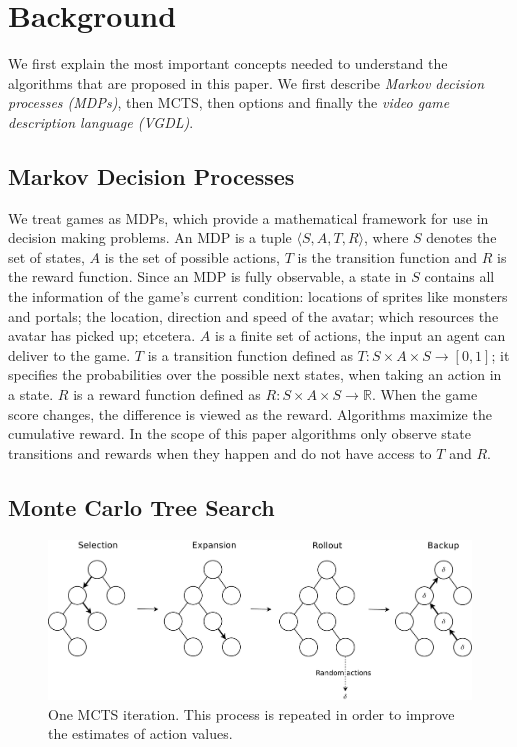 \section{Background}
\label{sec:background}

We first explain the most important concepts needed to understand the
algorithms that are proposed in this paper. We first describe \emph{Markov
decision processes (MDPs)}, then  MCTS, then options and finally the \emph{video
game description language (VGDL)}.

\subsection{Markov Decision Processes}
\label{subsec:mdps}
We treat games as MDPs, which provide a mathematical framework for use in
decision making problems. An MDP is a tuple $\langle S, A, T, R \rangle$, where
$S$ denotes the set of states, $A$ is the set of possible actions, $T$ is the
transition function and $R$ is the reward function. Since an MDP is fully
observable, a state in $S$ contains all the information of the game's current
condition: locations of sprites like monsters and portals; the location,
direction and speed of the avatar; which resources the avatar has picked up;
etcetera. $A$ is a finite set of actions, the input an agent can deliver to the
game. $T$ is a transition function defined as $T : S \times A \times S
\rightarrow \left[0,1\right]$; it specifies the probabilities over the possible
next states, when taking an action in a state.  $R$ is a reward function defined
as $R: S \times A \times S \rightarrow \mathbb{R}$. When the game score changes,
the difference is viewed as the reward.  Algorithms maximize the cumulative
reward. In the scope of this paper algorithms only observe state transitions
and rewards when they happen and do not have access to $T$ and $R$.

\subsection{Monte Carlo Tree Search}
\begin{figure}
	\centering
	\includegraphics[width=\columnwidth]{includes/mcts-wide-eps-converted-to}
	\caption{One MCTS iteration. This process is repeated in order to improve
	the estimates of action values.}
\label{fig:mcts}
\end{figure}

